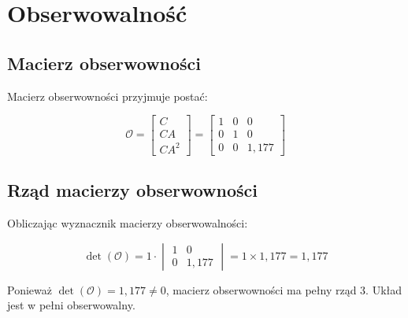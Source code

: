 \section{Obserwowalność}

\subsection{Macierz obserwowności}

Macierz obserwowności przyjmuje postać:

\begin{equation}
\mathcal{O} = \begin{bmatrix} C \\ CA \\ CA^2 \end{bmatrix} = \begin{bmatrix} 1 & 0 & 0 \\ 0 & 1 & 0 \\ 0 & 0 & 1{,}177 \end{bmatrix}
\end{equation}

\subsection{Rząd macierzy obserwowności}

Obliczając wyznacznik macierzy obserwowalności:

\begin{equation}
\det(\mathcal{O}) = 1 \cdot \begin{vmatrix} 1 & 0 \\ 0 & 1{,}177 \end{vmatrix} = 1 \times 1{,}177 = 1{,}177
\end{equation}

Ponieważ $\det(\mathcal{O}) = 1{,}177 \neq 0$, macierz obserwowności ma pełny rząd 3. Układ jest w pełni obserwowalny.


